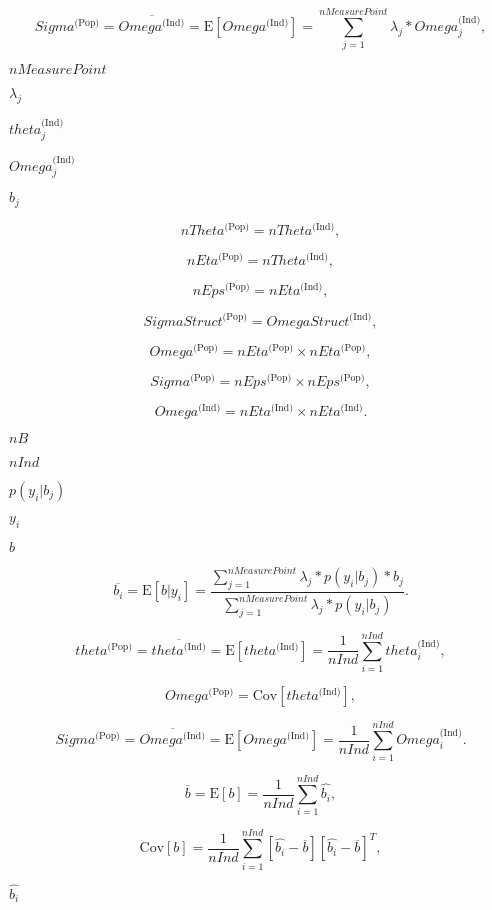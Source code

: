 \documentclass{article}
\begin{document}
\[ Sigma^{\mbox{(Pop)}} = \overline{ Omega^{\mbox{(Ind)}} } = \mbox{E}\left[ Omega^{\mbox{(Ind)}} \right] = \sum_{j = 1}^{nMeasurePoint} \lambda_j * Omega_j^{\mbox{(Ind)}} , \]
\pagebreak

$ nMeasurePoint $
\pagebreak

$ \lambda_j $
\pagebreak

$ theta_j^{\mbox{(Ind)}} $
\pagebreak

$ Omega_j^{\mbox{(Ind)}} $
\pagebreak

$ b_j $
\pagebreak

\[ nTheta^{\mbox{(Pop)}} = nTheta^{\mbox{(Ind)}} , \]
\pagebreak

\[ nEta^{\mbox{(Pop)}} = nTheta^{\mbox{(Ind)}} , \]
\pagebreak

\[ nEps^{\mbox{(Pop)}} = nEta^{\mbox{(Ind)}} , \]
\pagebreak

\[ SigmaStruct^{\mbox{(Pop)}} = OmegaStruct^{\mbox{(Ind)}} , \]
\pagebreak

\[ Omega^{\mbox{(Pop)}} = nEta^{\mbox{(Pop)}} \times nEta^{\mbox{(Pop)}} , \]
\pagebreak

\[ Sigma^{\mbox{(Pop)}} = nEps^{\mbox{(Pop)}} \times nEps^{\mbox{(Pop)}} , \]
\pagebreak

\[ Omega^{\mbox{(Ind)}} = nEta^{\mbox{(Ind)}} \times nEta^{\mbox{(Ind)}} . \]
\pagebreak

$ nB $
\pagebreak

$ nInd $
\pagebreak

$ p(y_i | b_j ) $
\pagebreak

$ y_i $
\pagebreak

$ b $
\pagebreak

\[ \overline{b_i} = \mbox{E}[b | y_i ] = \frac{ \sum_{j=1}^{nMeasurePoint} \lambda_j * p(y_i | b_j ) * b_j } {\sum_{j=1}^{nMeasurePoint} \lambda_j * p(y_i | b_j) } . \]
\pagebreak

\[ theta^{\mbox{(Pop)}} = \overline{ theta^{\mbox{(Ind)}} } = \mbox{E}\left[ theta^{\mbox{(Ind)}} \right] = \frac{1}{nInd} \sum_{i = 1}^{nInd} theta_i^{\mbox{(Ind)}} , \]
\pagebreak

\[ Omega^{\mbox{(Pop)}} = \mbox{Cov}\left[ theta^{\mbox{(Ind)}} \right] , \]
\pagebreak

\[ Sigma^{\mbox{(Pop)}} = \overline{ Omega^{\mbox{(Ind)}} } = \mbox{E}\left[ Omega^{\mbox{(Ind)}} \right] = \frac{1}{nInd} \sum_{i = 1}^{nInd} Omega_i^{\mbox{(Ind)}} . \]
\pagebreak

\[ \overline{ b } = \mbox{E}\left[ b \right] = \frac{1}{nInd} \sum_{i = 1}^{nInd} \hat{b_i} , \]
\pagebreak

\[ \mbox{Cov}\left[ b \right] = \frac{1}{nInd} \sum_{i = 1}^{nInd} \left[ \hat{b_i} - \overline{ b } \right] \left[ \hat{b_i} - \overline{ b } \right]^T , \]
\pagebreak

$ \hat{b_i} $
\pagebreak
\end{document}

